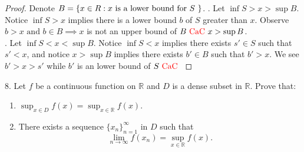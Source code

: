 \documentclass{report}
\begin{document}
\begin{proof}
Denote $B=\{ x\in R: x\text{ is a lower bound for $S$ } \}$. . Let $\inf S>x>\sup B$. Notice $\inf S>x$ implies there is a lower bound  $b$ of  $S$ greater than  $x$. Observe $b>x\text{ and }b \in B\implies x$ is not an upper bound of $B\text{ \textcolor{red}{CaC} } x>\sup B$.\\

. Let $\inf S<x<\sup B$. Notice $\inf S<x$ implies there exists $s' \in S$ such that $s'<x$, and notice $x> \sup B$ implies there exists $b'\in B$ such that $b'>x$. We see  $b'>x>s'$ while  $b'$ is an lower bound of  $S\text{ \textcolor{red}{CaC} }$
\end{proof}
\begin{question}{}{}
8. Let \( f \) be a continuous function on \( \mathbb{R} \) and \( D \) is a dense subset in \( \mathbb{R} \). Prove that:
\begin{enumerate}
    \item \( \sup_{x \in D} f(x) = \sup_{x \in \mathbb{R}} f(x) \).
    \item There exists a sequence \( \{x_n\}_{n=1}^{\infty} \) in \( D \) such that 
    \[
    \lim_{n \to \infty} f(x_n) = \sup_{x \in \mathbb{R}} f(x).
    \]
\end{enumerate}
\end{question}
\end{document}
